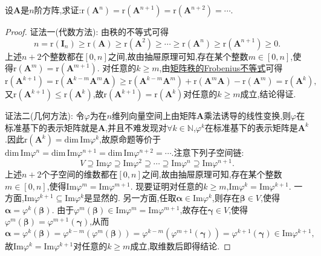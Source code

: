 \documentclass[../../main.tex]{subfiles}%
\begin{document}
\begin{proposition}\label{proposition:矩阵n次方幂秩等式}
设\(\boldsymbol{A}\)是\(n\)阶方阵,求证:\(\text{r}(\boldsymbol{A}^n)=\text{r}(\boldsymbol{A}^{n + 1})=\text{r}(\boldsymbol{A}^{n + 2})=\cdots\).
\end{proposition}
\begin{proof}

{\color{blue}证法一(代数方法):} 由秩的不等式可得
\[
n=\text{r}(\boldsymbol{I}_n)\geqslant \text{r}(\boldsymbol{A})\geqslant \text{r}(\boldsymbol{A}^2)\geqslant \cdots\geqslant \text{r}(\boldsymbol{A}^n)\geqslant \text{r}(\boldsymbol{A}^{n + 1})\geqslant  0.
\]
上述\(n + 2\)个整数都在\([0,n]\)之间,故由抽屉原理可知,存在某个整数\(m\in[0,n]\),使得\(\text{r}(\boldsymbol{A}^m)=\text{r}(\boldsymbol{A}^{m + 1})\). 对任意的\(k\geqslant  m\),由\hyperref[proposition:Frobenius(弗罗贝尼乌斯)不等式]{矩阵秩的Frobenius不等式}可得
\[
\text{r}(\boldsymbol{A}^{k + 1})=\text{r}(\boldsymbol{A}^{k - m}\boldsymbol{A}^m\boldsymbol{A})\geqslant \text{r}(\boldsymbol{A}^{k - m}\boldsymbol{A}^m)+\text{r}(\boldsymbol{A}^m\boldsymbol{A})-\text{r}(\boldsymbol{A}^m)=\text{r}(\boldsymbol{A}^k),
\]
又\(\text{r}(\boldsymbol{A}^{k + 1})\leqslant \text{r}(\boldsymbol{A}^k)\),故\(\text{r}(\boldsymbol{A}^{k + 1})=\text{r}(\boldsymbol{A}^k)\)对任意的\(k\geqslant  m\)成立,结论得证.

{\color{blue}证法二(几何方法):} 令\(\varphi\)为在\(n\)维列向量空间上由矩阵\(\boldsymbol{A}\)乘法诱导的线性变换,则\(\varphi\)在标准基下的表示矩阵就是\(\boldsymbol{A}\),并且不难发现对\(\forall k\in \mathbb{N}\),\(\varphi^k\)在标准基下的表示矩阵是\(\boldsymbol{A}^k\).因此\(\mathrm{r}(\boldsymbol{A}^k) = \mathrm{dim} \,\mathrm{Im}\varphi^k\),故原命题等价于$\mathrm{dim}\,\mathrm{Im}\varphi ^n=\mathrm{dim}\,\mathrm{Im}\varphi ^{n+1}=\mathrm{dim}\,\mathrm{Im}\varphi ^{n+2}=\cdots 
$.注意下列子空间链:
\[
V\supseteq\text{Im}\varphi\supseteq\text{Im}\varphi^2\supseteq\cdots\supseteq\text{Im}\varphi^n\supseteq\text{Im}\varphi^{n + 1}.
\]
上述\(n + 2\)个子空间的维数都在\([0,n]\)之间,故由抽屉原理可知,存在某个整数\(m\in[0,n]\),使得\(\text{Im}\varphi^m=\text{Im}\varphi^{m + 1}\). 现要证明对任意的\(k\geqslant  m\),\(\text{Im}\varphi^k=\text{Im}\varphi^{k + 1}\). 一方面,\(\text{Im}\varphi^{k + 1}\subseteq\text{Im}\varphi^k\)是显然的. 另一方面,任取\(\boldsymbol{\alpha}\in\text{Im}\varphi^k\),则存在\(\boldsymbol{\beta}\in V\),使得\(\boldsymbol{\alpha}=\varphi^k(\boldsymbol{\beta})\). 由于\(\varphi^m(\boldsymbol{\beta})\in\text{Im}\varphi^m=\text{Im}\varphi^{m + 1}\),故存在\(\boldsymbol{\gamma}\in V\),使得\(\varphi^m(\boldsymbol{\beta})=\varphi^{m + 1}(\boldsymbol{\gamma})\),从而
\[
\boldsymbol{\alpha}=\varphi^k(\boldsymbol{\beta})=\varphi^{k - m}(\varphi^m(\boldsymbol{\beta}))=\varphi^{k - m}(\varphi^{m + 1}(\boldsymbol{\gamma}))=\varphi^{k + 1}(\boldsymbol{\gamma})\in\text{Im}\varphi^{k + 1},
\]
故\(\text{Im}\varphi^k=\text{Im}\varphi^{k + 1}\)对任意的\(k\geqslant  m\)成立,取维数后即得结论. 
\end{proof}
\end{document}
